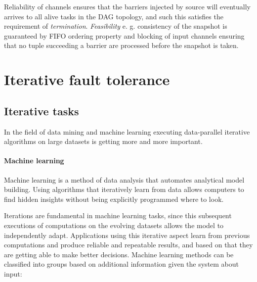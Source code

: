 Reliability of channels ensures that the barriers injected by source will eventually arrives to all alive tasks in the DAG topology, and such this  satisfies the requirement of \textit{termination}. \textit{Feasibility} e. g. consistency of the snapshot is guaranteed by FIFO ordering property and blocking of input channels ensuring that no tuple succeeding a barrier are processed before the snapshot is taken. 



\section{Iterative fault tolerance }
\subsection{Iterative tasks}
In the field of data mining and machine learning executing data-parallel iterative algorithms on large datasets is getting more and more important.
\paragraph{Machine learning}
\begin{displayquote}
Machine learning\cite{ml}%
is a method of data analysis that automates analytical model building. Using algorithms that iteratively learn from data allows computers to find hidden insights without being explicitly programmed where to look.
\end{displayquote}
Iterations are fundamental in machine learning tasks, since this subsequent executions of computations on the evolving datasets allows the model to independently adapt. Applications using this iterative aspect learn from previous computations and produce reliable and repeatable results, and based on that they are getting able to make better decisions.
Machine learning methods\cite{ml}%
 can be classified into groups based on additional information given the system about input:
 
